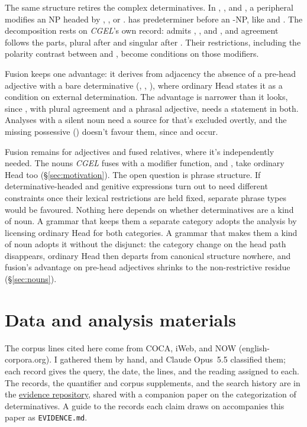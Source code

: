 \documentclass[12pt]{article}
\begin{document}
The same structure retires the complex determinatives. In , , and , a peripheral  modifies an NP headed by , , or .  has predeterminer  before an -NP, like  and . The decomposition rests on \textit{CGEL}'s own record:  admits , , and , and agreement follows the parts, plural after  and singular after . Their restrictions, including the polarity contrast between  and , become conditions on those modifiers.

Fusion keeps one advantage: it derives from adjacency the absence of a pre-head adjective with a bare determinative (, , ), where ordinary Head states it as a condition on external determination. The advantage is narrower than it looks, since , with plural agreement and a phrasal adjective, needs a statement in both. Analyses with a silent noun need a source for  that's excluded overtly, and the missing possessive () doesn't favour them, since  and  occur.

Fusion remains for adjectives and fused relatives, where it's independently needed. The nouns \textit{CGEL} fuses with a modifier function,  and , take ordinary Head too (§\ref{sec:motivation}). The open question is phrase structure. If determinative-headed and genitive expressions turn out to need different constraints once their lexical restrictions are held fixed, separate phrase types would be favoured. Nothing here depends on whether determinatives are a kind of noun. A grammar that keeps them a separate category adopts the analysis by licensing ordinary Head for both categories. A grammar that makes them a kind of noun adopts it without the disjunct: the category change on the head path disappears, ordinary Head then departs from canonical structure nowhere, and fusion's advantage on pre-head adjectives shrinks to the non-restrictive residue (§\ref{sec:nouns}).

\section*{Data and analysis materials}

The corpus lines cited here come from COCA, iWeb, and NOW (english-corpora.org). I gathered them by hand, and Claude Opus~5.5 classified them; each record gives the query, the date, the lines, and the reading assigned to each. The records, the quantifier and corpus supplements, and the search history are in the \href{https://github.com/BrettRey/determinatives-as-nouns}{evidence repository}, shared with a companion paper on the categorization of determinatives. A guide to the records each claim draws on accompanies this paper as \texttt{EVIDENCE.md}.

\clearpage
\printbibliography
\end{document}
